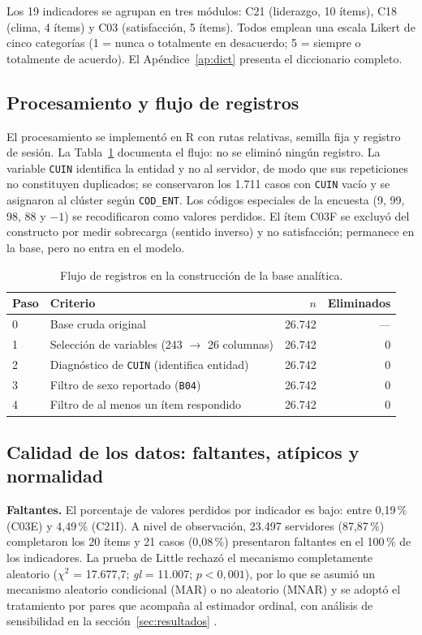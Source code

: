 \documentclass[11pt,a4paper]{article}
\newcommand{\df}{\textit{gl}}
\begin{document}
Los 19 indicadores se agrupan en tres módulos: C21 (liderazgo, 10 ítems), C18 (clima, 4
ítems) y C03 (satisfacción, 5 ítems). Todos emplean una escala Likert de cinco categorías
(1 = nunca o totalmente en desacuerdo; 5 = siempre o totalmente de acuerdo). El Apéndice~\ref{ap:dict}
presenta el diccionario completo.

\subsection{Procesamiento y flujo de registros}

El procesamiento se implementó en R con rutas relativas, semilla fija y registro de
sesión. La Tabla~\ref{tab:flujo} documenta el flujo: no se eliminó ningún registro. La
variable \texttt{CUIN} identifica la entidad y no al servidor, de modo que sus repeticiones
no constituyen duplicados; se conservaron los 1.711 casos con \texttt{CUIN} vacío y se
asignaron al clúster según \texttt{COD\_ENT}. Los códigos especiales de la encuesta (9, 99,
98, 88 y $-1$) se recodificaron como valores perdidos. El ítem C03F se excluyó del
constructo por medir sobrecarga (sentido inverso) y no satisfacción; permanece en la base,
pero no entra en el modelo.

\begin{table}[htbp]
\centering
\caption{Flujo de registros en la construcción de la base analítica.}
\label{tab:flujo}
\small
\begin{tabular}{@{}llrr@{}}
\toprule
Paso & Criterio & $n$ & Eliminados \\
\midrule
0 & Base cruda original & 26.742 & --- \\
1 & Selección de variables (243 $\rightarrow$ 26 columnas) & 26.742 & 0 \\
2 & Diagnóstico de \texttt{CUIN} (identifica entidad) & 26.742 & 0 \\
3 & Filtro de sexo reportado (\texttt{B04}) & 26.742 & 0 \\
4 & Filtro de al menos un ítem respondido & 26.742 & 0 \\
\bottomrule
\end{tabular}
\end{table}

\subsection{Calidad de los datos: faltantes, atípicos y normalidad}

\textbf{Faltantes.} El porcentaje de valores perdidos por indicador es bajo: entre 0,19\,\%
(C03E) y 4,49\,\% (C21I). A nivel de observación, 23.497 servidores (87,87\,\%) completaron
los 20 ítems y 21 casos (0,08\,\%) presentaron faltantes en el 100\,\% de los indicadores.
La prueba de Little rechazó el mecanismo completamente aleatorio
($\chi^2$ = 17.677,7; \df{} = 11.007; $p < 0,001$), por lo que se asumió un mecanismo
aleatorio condicional (MAR) o no aleatorio (MNAR) y se adoptó el tratamiento por pares que
acompaña al estimador ordinal, con análisis de sensibilidad en la sección~\ref{sec:resultados}
\citep{enders2022,little1988}.
\end{document}
